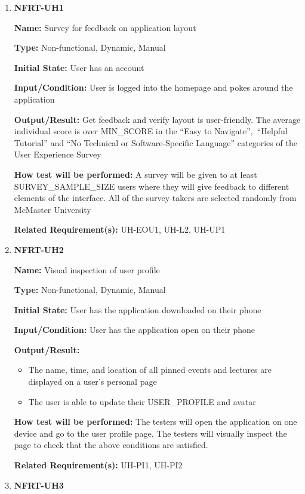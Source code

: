 \documentclass[12pt, titlepage]{article}
\begin{document}
\begin{enumerate}
\item{\textbf{NFRT-UH1}}

\textbf{Name:} Survey for feedback on application layout

\textbf{Type:} Non-functional, Dynamic, Manual
					
\textbf{Initial State:} User has an account

\textbf{Input/Condition:} User is logged into the homepage and pokes around the application
					
\textbf{Output/Result:} Get feedback and verify layout is user-friendly. The average individual score is over MIN\_SCORE in the ``Easy to Navigate'',\
``Helpful Tutorial'' and ``No Technical or Software-Specific Language'' categories of the User Experience Survey
					
\textbf{How test will be performed:} A survey will be given to at least
SURVEY\_SAMPLE\_SIZE users where they will give feedback to different elements of the interface. All of the survey takers are selected randomly from McMaster University

\textbf{Related Requirement(s):} UH-EOU1, UH-L2, UH-UP1

\item{\textbf{NFRT-UH2}}

\textbf{Name:} Visual inspection of user profile

\textbf{Type:} Non-functional, Dynamic, Manual
					
\textbf{Initial State:} User has the application downloaded on their phone
					
\textbf{Input/Condition:} User has the application open on their phone
					
\textbf{Output/Result:}
\begin{itemize}
  \item The name, time, and location of all pinned events and lectures are displayed on a user's personal page
  \item The user is able to update their USER\_PROFILE and avatar
\end{itemize}

\textbf{How test will be performed:} The testers will open the application on one device and go to the user profile page. The testers will visually inspect the page to check that the above conditions are satisfied.

\textbf{Related Requirement(s):} UH-PI1, UH-PI2

\item{\textbf{NFRT-UH3}}


\end{enumerate}
\end{document}
